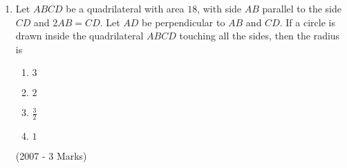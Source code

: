 \begin{enumerate}[label=\thesubsection.\arabic*,ref=\thesubsection.\theenumi]
\item Let $ABCD$ be a quadrilateral with area $18$, with side $AB$ parallel to the side $CD$ and $2AB = CD$. Let $AD$ be perpendicular to $AB$ and $CD$. If a circle is drawn inside the quadrilateral $ABCD$ touching all the sides, then the radius is
\begin{enumerate}
\item $3$
\item $2$
\item $\frac{3}{2}$
\item $1$
\end{enumerate}
\hfill (2007 - 3 Marks)

\end{enumerate}

